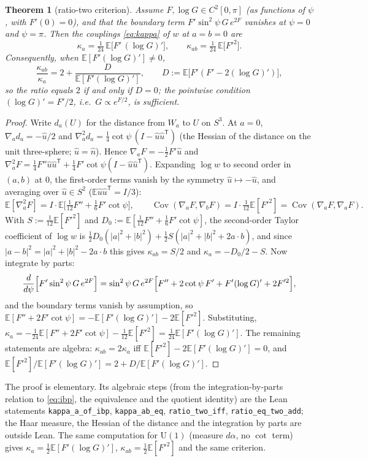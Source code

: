 \documentclass[11pt,a4paper]{article}
\newtheorem{theorem}{Theorem}
\theoremstyle{definition}
\theoremstyle{remark}
\newcommand{\E}{\mathbb{E}}
\newcommand{\Cov}{\operatorname{Cov}}
\newcommand{\code}[1]{\texttt{#1}}
\begin{document}
\begin{theorem}[ratio-two criterion]\label{thm:criterion}
Assume $F,\log G\in C^2[0,\pi]$ (as functions of $\psi$, with $F'(0)=0$), and that the boundary term $F'\sin^2\psi\,G\,e^{2F}$ vanishes at $\psi=0$ and $\psi=\pi$.
Then the couplings \eqref{eq:kappa} of $w$ at $a=b=0$ are
\begin{equation}\label{eq:ibp}
\kappa_a=\tfrac1{24}\,\E\bigl[F'\,(\log G)'\bigr],\qquad \kappa_{ab}=\tfrac1{24}\,\E\bigl[F'^2\bigr].
\end{equation}
Consequently, when $\E[F'(\log G)']\ne0$,
\[
\frac{\kappa_{ab}}{\kappa_a}=2+\frac{D}{\E[F'(\log G)']},\qquad D:=\E\bigl[F'(F'-2(\log G)')\bigr],
\]
so the ratio equals $2$ if and only if $D=0$; the pointwise condition $(\log G)'=F'/2$, i.e.\ $G\propto e^{F/2}$, is sufficient.
\end{theorem}

\begin{proof}
Write $d_a(U)$ for the distance from $W_a$ to $U$ on $S^3$.
At $a=0$, $\nabla_a d_a=-\hat u/2$ and $\nabla_a^2d_a=\tfrac14\cot\psi\,(I-\hat u\hat u^{\mathsf T})$ (the Hessian of the distance on the unit three-sphere; $\hat u=\hat n$).
Hence $\nabla_aF=-\tfrac12F'\hat u$ and $\nabla_a^2F=\tfrac14F''\hat u\hat u^{\mathsf T}+\tfrac14F'\cot\psi(I-\hat u\hat u^{\mathsf T})$.
Expanding $\log w$ to second order in $(a,b)$ at $0$, the first-order terms vanish by the symmetry $\hat u\mapsto-\hat u$, and averaging over $\hat u\in S^2$ ($\E\hat u\hat u^{\mathsf T}=I/3$):
\[
\E[\nabla_a^2F]=I\cdot\E\bigl[\tfrac1{12}F''+\tfrac16F'\cot\psi\bigr],\qquad \Cov(\nabla_aF,\nabla_bF)=I\cdot\tfrac1{12}\E[F'^2]=\Cov(\nabla_aF,\nabla_aF).
\]
With $S:=\tfrac1{12}\E[F'^2]$ and $D_0:=\E[\tfrac1{12}F''+\tfrac16F'\cot\psi]$, the second-order Taylor coefficient of $\log w$ is $\tfrac12D_0(|a|^2+|b|^2)+\tfrac12S(|a|^2+|b|^2+2a\cdot b)$, and since $|a-b|^2=|a|^2+|b|^2-2a\cdot b$ this gives $\kappa_{ab}=S/2$ and $\kappa_a=-D_0/2-S$.
Now integrate by parts:
\[
\frac{d}{d\psi}\Bigl[F'\sin^2\psi\,G\,e^{2F}\Bigr]=\sin^2\psi\,G\,e^{2F}\Bigl[F''+2\cot\psi\,F'+F'(\log G)'+2F'^2\Bigr],
\]
and the boundary terms vanish by assumption, so $\E[F''+2F'\cot\psi]=-\E[F'(\log G)']-2\E[F'^2]$.
Substituting, $\kappa_a=-\tfrac1{24}\E[F''+2F'\cot\psi]-\tfrac1{12}\E[F'^2]=\tfrac1{24}\E[F'(\log G)']$.
The remaining statements are algebra: $\kappa_{ab}=2\kappa_a$ iff $\E[F'^2]-2\E[F'(\log G)']=0$, and $\E[F'^2]/\E[F'(\log G)']=2+D/\E[F'(\log G)']$.
\end{proof}

The proof is elementary.
Its algebraic steps (from the integration-by-parts relation to \eqref{eq:ibp}, the equivalence and the quotient identity) are the Lean statements \code{kappa\_a\_of\_ibp}, \code{kappa\_ab\_eq}, \code{ratio\_two\_iff}, \code{ratio\_eq\_two\_add}; the Haar measure, the Hessian of the distance and the integration by parts are outside Lean.
The same computation for $\mathrm{U}(1)$ (measure $d\alpha$, no $\cot$ term) gives $\kappa_a=\tfrac12\E[F'(\log G)']$, $\kappa_{ab}=\tfrac12\E[F'^2]$ and the same criterion.
\end{document}
